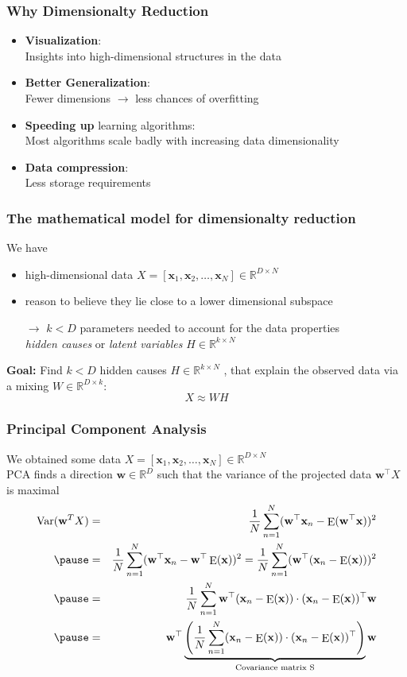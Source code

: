 \documentclass[Nike]{tuberlinbeamer}
\newcommand{\R}{\ensuremath{\mathds{R}}}
\newcommand{\bx}{{\mathbf x}}
\newcommand{\bw}{\mathbf{w}}
\DeclareMathOperator*{\E}{E}
\begin{document}
\begin{frame}\frametitle{Why Dimensionalty Reduction}
\begin{itemize}
\item \textbf{Visualization}:  \\ Insights into high-dimensional structures in the data
\item \textbf{Better Generalization}: \\ Fewer dimensions $\rightarrow$ less chances of overfitting
\item \textbf{Speeding up} learning algorithms: \\
Most algorithms scale badly with increasing data dimensionality
\item \textbf{Data compression}: \\
Less storage requirements
\end{itemize}
\end{frame}

\begin{frame}\frametitle{The mathematical model for dimensionalty reduction}
We have
\begin{itemize}
\item high-dimensional data $X=[\bx_1,\bx_2,\dots,\bx_N]\in\R^{D\times N}$
\item reason to believe they lie close to a lower dimensional subspace
\item[$\rightarrow$] $k < D$ parameters needed to account for the data properties \\
{\em hidden causes} or {\em latent variables}  $H \in \R^{k \times N}$
\end{itemize}
\vspace{1em} \pause
\textbf{Goal:}  Find $k < D$  hidden causes  $H \in \R^{k \times N}$ , that explain the observed data via a mixing $W \in \R^{D \times k}$:
\[ X \approx W H\]
\end{frame}

\begin{frame}\frametitle{Principal Component Analysis}
\small
We obtained some data $X=[\bx_1,\bx_2,\dots,\bx_N]\in\R^{D\times N}$\\
PCA finds a direction $\bw \in\R^D$ such that the variance of the projected data $\bw^\top X$
is maximal  \pause
\begin{eqnarray*}
\Var(\bw^T X) &=& \frac{1}{N} \sum_{n = 1}^{N} (\bw^\top \bx_n - \E(\bw^\top \bx))^2 \\ \pause
 &=& \frac{1}{N} \sum_{n = 1}^{N} (\bw^\top \bx_n - \bw^\top \E(\bx))^2 = \frac{1}{N} \sum_{n = 1}^{N} (\bw^\top (\bx_n - \E(\bx)))^2 \\\pause
 &=& \frac{1}{N} \sum_{n = 1}^{N} \bw^\top (\bx_n - \E(\bx)) \cdot  (\bx_n - \E(\bx))^\top \bw \\\pause
 &=& \bw^\top \underbrace{\left( \frac{1}{N} \sum_{n = 1}^{N}  (\bx_n - \E(\bx)) \cdot  (\bx_n - \E(\bx))^\top \right)}_{\text{Covariance matrix S}}\bw
\end{eqnarray*}
\end{frame}
\end{document}
